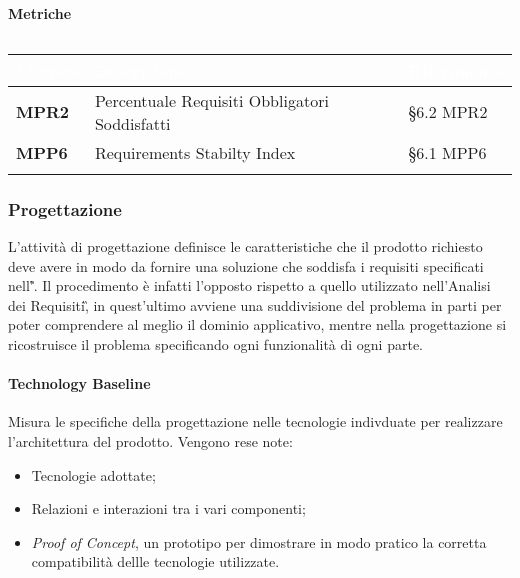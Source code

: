 \newpage

\paragraph{Metriche}
\setlength{\freewidth}{\dimexpr\textwidth-0\tabcolsep}
\renewcommand{\arraystretch}{1.5}
\setlength{\aboverulesep}{0pt}
\setlength{\belowrulesep}{0pt}
\begin{longtable}{L{.22\freewidth} L{.4\freewidth} L{.2\freewidth}}
	\toprule
	\textcolor{white}{\textbf{Metrica}}&
	\textcolor{white}{\textbf{Descrizione}}&	
	\textcolor{white}{\textbf{Riferimento}}\\	
	\toprule
	\endhead
	
	\textbf{MPR2} & Percentuale Requisiti Obbligatori Soddisfatti & \S 6.2 MPR2 \\
	\textbf{MPP6} & Requirements Stabilty Index & \S 6.1 MPP6 \\
	
	\bottomrule
	\caption*{}
\end{longtable}

\subsubsection{Progettazione} 
L'attività di progettazione definisce le caratteristiche che il prodotto richiesto deve avere in modo da fornire una soluzione che soddisfa i requisiti specificati nell'\AdR{}\textit{\G}.
Il procedimento è infatti l'opposto rispetto a quello utilizzato nell'Analisi dei Requisiti\G, in quest'ultimo avviene una suddivisione del problema in parti
per poter comprendere al meglio il dominio applicativo, mentre nella progettazione si ricostruisce il problema specificando ogni funzionalità di ogni parte.

\paragraph{Technology Baseline}
Misura le specifiche della progettazione nelle tecnologie indivduate per realizzare l'architettura del prodotto. Vengono rese note:
\begin{itemize}
	\item Tecnologie adottate;
	\item Relazioni e interazioni tra i vari componenti;
	\item {\textit{Proof of Concept}}, un prototipo per dimostrare in modo pratico la corretta compatibilità  dellle tecnologie utilizzate.
\end{itemize}

